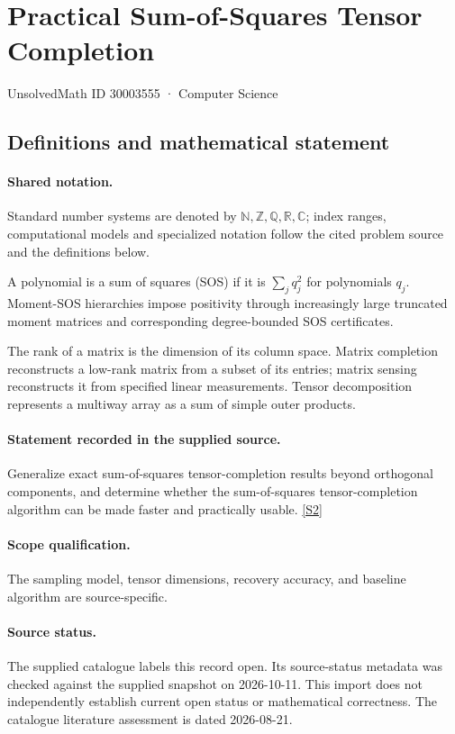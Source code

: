 \documentclass[11pt]{article}
\newcommand{\sref}[2]{\hyperlink{source:#1:#2}{[S#2]}}
\begin{document}
\setcounter{section}{30003554}
\section{Practical Sum-of-Squares Tensor Completion}\label{30003555}
{\small\sffamily UnsolvedMath ID 30003555 · Computer Science}
\subsection{Definitions and mathematical statement}

\paragraph{Shared notation.}Standard number systems are denoted by $\mathbb N,\mathbb Z,\mathbb Q,\mathbb R,\mathbb C$; index ranges, computational models and specialized notation follow the cited problem source and the definitions below.


A polynomial is a sum of squares (SOS) if it is $\sum_j q_j^2$ for polynomials $q_j$. Moment-SOS hierarchies impose positivity through increasingly large truncated moment matrices and corresponding degree-bounded SOS certificates.

The rank of a matrix is the dimension of its column space. Matrix completion reconstructs a low-rank matrix from a subset of its entries; matrix sensing reconstructs it from specified linear measurements. Tensor decomposition represents a multiway array as a sum of simple outer products.
\paragraph{Statement recorded in the supplied source.}
Generalize exact sum-of-squares tensor-completion results beyond orthogonal components, and determine whether the sum-of-squares tensor-completion algorithm can be made faster and practically usable. \sref{30003555}{2}
\paragraph{Scope qualification.}
The sampling model, tensor dimensions, recovery accuracy, and baseline algorithm are source-specific.
\paragraph{Source status.}
The supplied catalogue labels this record open. Its source-status metadata was checked against the supplied snapshot on 2026-10-11. This import does not independently establish current open status or mathematical correctness. The catalogue literature assessment is dated 2026-08-21.
\end{document}
